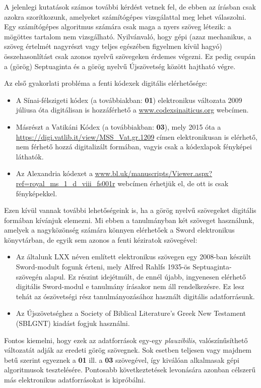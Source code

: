 \documentclass{article}
\begin{document}
A jelenlegi kutatások számos további kérdést vetnek fel, de ebben az írásban csak azokra szorítkozunk,
amelyeket számítógépes vizsgálattal meg lehet válaszolni. Egy számítógépes algoritmus számára
csak maga a nyers szöveg létezik: a mögöttes tartalom nem vizsgálható.
Nyilvánvaló, hogy gépi (azaz mechanikus,
a szöveg értelmét nagyrészt vagy teljes egészében figyelmen kívül hagyó) összehasonlítást csak
azonos nyelvű szövegeken érdemes végezni. Ez pedig csupán a (görög) Septuaginta és a görög nyelvű
Újszövetség között hajtható végre.

Az első gyakorlati probléma a fenti kódexek digitális elérhetősége:
\begin{itemize}
\item A Sínai-félszigeti kódex (a továbbiakban: \textbf{01})
elektronikus változata 2009 júliusa óta digitálisan is hozzáférhető a \url{www.codexsinaiticus.org} webcímen.
\item Másrészt a Vatikáni Kódex (a továbbiakban: \textbf{03}), mely
2015 óta a \url{https://digi.vatlib.it/view/MSS_Vat.gr.1209} címen elektronikusan is elérhető, nem férhető hozzá
digitalizált formában, vagyis csak a kódexlapok fényképei láthatók.
\item Az Alexandria kódexet a \url{www.bl.uk/manuscripts/Viewer.aspx?ref=royal_ms_1_d_viii_fs001r}
webcímen érhetjük el, de ott is csak fényképekkel.
\end{itemize}

Ezen kívül vannak további lehetőségeink is, ha a görög nyelvű szövegeket digitális formában kívánjuk
elemezni. Mi ebben a tanulmányban két szöveget használunk, amelyek a nagyközönség számára könnyen
elérhetőek a Sword \cite{Sword} elektronikus könyvtárban, de egyik sem azonos a fenti kéziratok szövegével:
\begin{itemize}
\item Az általunk LXX néven említett elektronikus szövegen egy 2008-ban készült Sword-modult fogunk érteni,
mely Alfred Rahlfs 1935-ös Septuaginta-szövegén alapul. Ez részint idejétmúlt, de ennél újabb, ingyenesen
elérhető digitális Sword-modul e tanulmány írásakor nem áll rendelkezésre. Ez lesz tehát az ószövetségi
rész tanulmányozásához használt digitális adatforrásunk.
\item Az Újszövetséghez a Society of Biblical Literature's Greek New Testament
(SBLGNT) kiadást fogjuk használni.
\end{itemize}
Fontos kiemelni, hogy ezek az adatforrások egy-egy \textit{plauzibilis}, valószínűsíthető változatát adják
az eredeti görög szövegnek. Sok esetben teljesen vagy majdnem betű szerint egyeznek a \textbf{01} ill.
a \textbf{03} szövegével, így kiválóan alkalmasak gépi algoritmusok tesztelésére. Pontosabb következtetések
levonására azonban célszerű más elektronikus adatforrásokat is kipróbálni.
\end{document}
